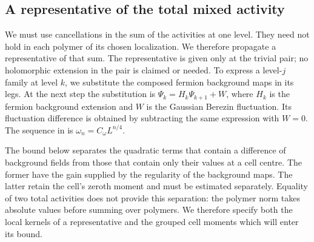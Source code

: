 \documentclass[11pt,letterpaper,reqno]{amsart}
\theoremstyle{definition}
\theoremstyle{remark}
\begin{document}
\subsection{A representative of the total mixed activity}

We must use cancellations in the sum of the activities at one
level.  They need not hold in each polymer of its chosen
localization.  We therefore propagate a representative of that
sum.  The representative is given only at the trivial pair;
no holomorphic extension in the pair is claimed or needed.
To express a level-$j$ family at level $k$, we substitute the
composed fermion background maps in its legs. At the next step
the substitution is $\Psi_k=H_k\Psi_{k+1}+W$, where $H_k$ is
the fermion background extension and $W$ is the Gaussian
Berezin fluctuation. Its fluctuation difference is obtained
by subtracting the same expression with $W=0$.
The sequence in \cite[Lem. 7.9]{QCDM1} is
$\omega_n=C_\omega L^{n/4}$.

The bound below separates the quadratic terms that contain a
difference of background fields from those that contain only their
values at a cell centre.  The former have the gain supplied by the
regularity of the background maps.  The latter retain the cell's
zeroth moment and must be estimated separately.  Equality of two
total activities does not provide this separation: the polymer norm
takes absolute values before summing over polymers.  We therefore
specify both the local kernels of a representative and the grouped
cell moments which will enter its bound.
\end{document}
